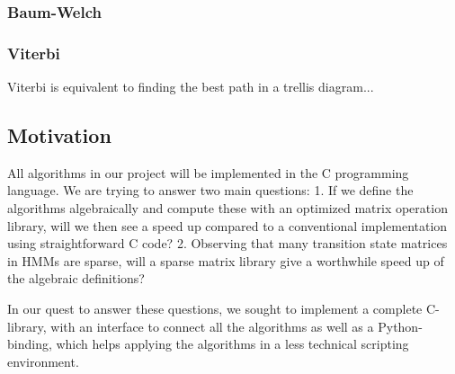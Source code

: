 \subsubsection{Baum-Welch}
\subsubsection{Viterbi}
Viterbi is equivalent to finding the best path in a trellis diagram...


\subsection{Motivation}
All algorithms in our project will be implemented in the C programming language. We are trying to answer two main questions: 1. If we define the algorithms algebraically and compute these with an optimized matrix operation library, will we then see a speed up compared to a conventional implementation using straightforward C code? 2. Observing that many transition state matrices in HMMs are sparse, will a sparse matrix library give a worthwhile speed up of the algebraic definitions? 

In our quest to answer these questions, we sought to implement a complete C-library, with an interface to connect all the algorithms as well as a Python-binding, which helps applying the algorithms in a less technical scripting environment.

